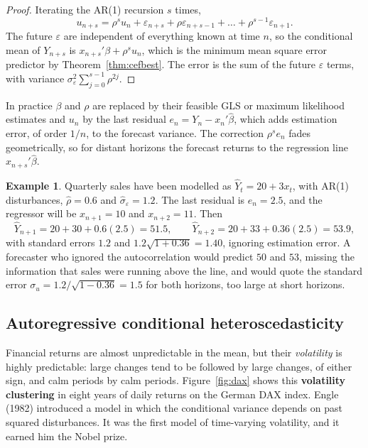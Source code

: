 \documentclass[11pt,a4paper]{article}
\numberwithin{equation}{section}
\theoremstyle{definition}
\newtheorem{exa}[thm]{Example}
\begin{document}
\begin{proof}
Iterating the AR(1) recursion $s$ times,
\[
u_{n+s} = \rho^su_n + \varepsilon_{n+s} + \rho\varepsilon_{n+s-1} + \dots + \rho^{s-1}\varepsilon_{n+1} .
\]
The future $\varepsilon$ are independent of everything known at time $n$, so the conditional mean of $Y_{n+s}$ is $x_{n+s}'\beta + \rho^su_n$, which is the minimum mean square
error predictor by Theorem~\ref{thm:cefbest}. The error is the sum of the future $\varepsilon$ terms, with variance $\sigma_\varepsilon^2\sum_{j=0}^{s-1}\rho^{2j}$.
\end{proof}

In practice $\beta$ and $\rho$ are replaced by their feasible GLS or maximum likelihood estimates and $u_n$ by the last residual $e_n = Y_n - x_n'\hat\beta$, which
adds estimation error, of order $1/n$, to the forecast variance. The correction $\rho^se_n$ fades geometrically, so for distant horizons the forecast
returns to the regression line $x_{n+s}'\hat\beta$.

\begin{exa}
\label{ex:acforecast}
Quarterly sales have been modelled as $\hat Y_t = 20 + 3x_t$, with AR(1) disturbances, $\hat\rho = 0.6$ and $\hat\sigma_\varepsilon = 1.2$. The last residual is $e_n = 2.5$, and the
regressor will be $x_{n+1} = 10$ and $x_{n+2} = 11$. Then
\[
\hat Y_{n+1} = 20 + 30 + 0.6(2.5) = 51.5, \qquad \hat Y_{n+2} = 20 + 33 + 0.36(2.5) = 53.9 ,
\]
with standard errors $1.2$ and $1.2\sqrt{1 + 0.36} = 1.40$, ignoring estimation error. A forecaster who ignored the autocorrelation would predict $50$ and $53$, missing
the information that sales were running above the line, and would quote the standard error $\sigma_u = 1.2/\sqrt{1 - 0.36} = 1.5$ for both horizons, too large at short
horizons.
\end{exa}

\subsection{Autoregressive conditional heteroscedasticity}
\label{ssec:arch}

Financial returns are almost unpredictable in the mean, but their \emph{volatility} is highly predictable: large changes tend to be followed by large
changes, of either sign, and calm periods by calm periods. Figure~\ref{fig:dax} shows this \textbf{volatility clustering} in eight years of daily returns on
the German DAX index. Engle (1982) introduced a model in which the conditional variance depends on past squared disturbances. It was the first
model of time-varying volatility, and it earned him the Nobel prize.
\end{document}
